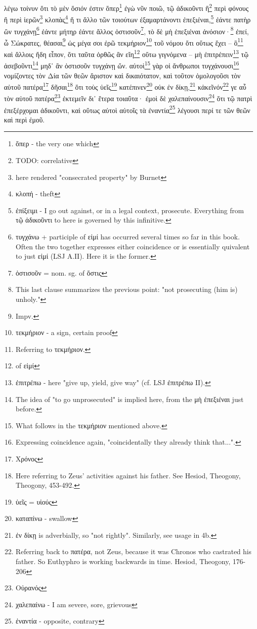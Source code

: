 λέγω
τοίνυν
ὅτι
τὸ
μὲν
ὅσιόν
ἐστιν
ὅπερ\footnote{ὅπερ - the very one which}
ἐγὼ
νῦν
ποιῶ,
τῷ
ἀδικοῦντι
ἢ\footnote{TODO: correlative}
περὶ
φόνους
ἢ
περὶ
ἱερῶν\footnote{here rendered "consecrated property" by Burnet}
κλοπὰς\footnote{κλοπή - theft}
ἤ
τι
ἄλλο
τῶν
τοιούτων
ἐξαμαρτάνοντι
ἐπεξιέναι,\footnote{ἐπίξειμι - I go out against, or in a legal context, prosecute. Everything from τῷ ἀδικοῦντι to here is governed by this infinitive.}
ἐάντε
πατὴρ
\versification{[5e]}
ὢν
τυγχάνῃ\footnote{τυγχάνω + participle of εἰμί has occurred several times so far in this book. Often the two together expresses either coincidence or is essentially quivalent to just εἰμί (LSJ A.II). Here it is the former.}
ἐάντε
μήτηρ
ἐάντε
ἄλλος
ὁστισοῦν\footnote{ὁστισοῦν = nom. sg. of ὅστις},
τὸ
δὲ
μὴ
ἐπεξιέναι
ἀνόσιον·\footnote{This last clause summarizes the previous point: "not prosecuting (him is) unholy."}
ἐπεί,
ὦ
Σώκρατες,
θέασαι\footnote{Impv.}
ὡς
μέγα
σοι
ἐρῶ
τεκμήριον\footnote{τεκμήριον - a sign, certain proof}
τοῦ
νόμου
ὅτι
οὕτως
ἔχει
--
ὃ\footnote{Referring to τεκμήριον.}
καὶ
ἄλλοις
ἤδη
εἶπον,
ὅτι
ταῦτα
ὀρθῶς
ἂν
εἴη\footnote{ of εἰμί}
οὕτω
γιγνόμενα
--
μὴ
ἐπιτρέπειν\footnote{ἐπιτρέπω - here "give up, yield, give way" (cf. LSJ ἐπιτρέπω II).}
τῷ
ἀσεβοῦντι\footnote{The idea of "to go unprosecuted" is implied here, from the μὴ ἐπεξιέναι just before.}
μηδ᾽
ἂν
ὁστισοῦν
τυγχάνῃ
ὤν.
αὐτοὶ\footnote{What follows in the τεκμήριον mentioned above.}
γὰρ
οἱ
ἄνθρωποι
τυγχάνουσι\footnote{Expressing coincidence again, "coincidentally they already think that...".}
νομίζοντες
τὸν
Δία
τῶν
θεῶν
ἄριστον
καὶ
δικαιότατον,
\versification{[6a]}
καὶ
τοῦτον
ὁμολογοῦσι
τὸν
αὑτοῦ
πατέρα\footnote{Χρόνος}
δῆσαι\footnote{Here referring to Zeus' activities against his father. See Hesiod, Theogony, Theogony, 453-492.}
ὅτι
τοὺς
ὑεῖς\footnote{ὑεῖς = υἱούς}
κατέπινεν\footnote{καταπίνω - swallow}
οὐκ
ἐν
δίκῃ,\footnote{ἐν δίκῃ is adverbially, so "not rightly". Similarly, see usage in 4b.}
κἀκεῖνόν\footnote{Referring back to πατέρα, not Zeus, because it was Chronos who castrated his father. So Euthyphro is working backwards in time. Hesiod, Theogony, 176-206}
γε
αὖ
τὸν
αὑτοῦ
πατέρα\footnote{Οὐρανός}
ἐκτεμεῖν
δι᾽
ἕτερα
τοιαῦτα·
ἐμοὶ
δὲ
χαλεπαίνουσιν\footnote{χαλεπαίνω - I am severe, sore, grievous}
ὅτι
τῷ
πατρὶ
ἐπεξέρχομαι
ἀδικοῦντι,
καὶ
οὕτως
αὐτοὶ
αὑτοῖς
τὰ
ἐναντία\footnote{ἐναντία - opposite, contrary}
λέγουσι
περί
τε
τῶν
θεῶν
καὶ
περὶ
ἐμοῦ.








